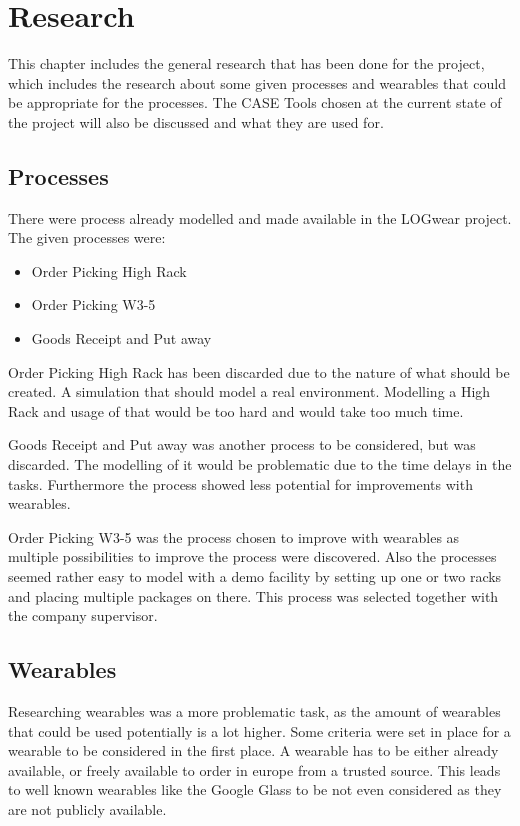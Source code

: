 \chapter{Research}\label{cha:research}
This chapter includes the general research that has been done for the project, which includes the research about some given processes and wearables that could be appropriate for the processes. The CASE Tools chosen at the current state of the project will also be discussed and what they are used for.

\section{Processes}\label{sec:processes}
There were process already modelled and made available in the LOGwear project. The given processes were:

\begin{itemize}
	\item Order Picking High Rack
	\item Order Picking W3-5
	\item Goods Receipt and Put away
\end{itemize}

Order Picking High Rack has been discarded due to the nature of what should be created. A simulation that should model a real environment. Modelling a High Rack and usage of that would be too hard and would take too much time.

Goods Receipt and Put away was another process to be considered, but was discarded. The modelling of it would be problematic due to the time delays in the tasks. Furthermore the process showed less potential for improvements with wearables.

Order Picking W3-5 was the process chosen to improve with wearables as multiple possibilities to improve the process were discovered. Also the processes seemed rather easy to model with a demo facility by setting up one or two racks and placing multiple packages on there. This process was selected together with the company supervisor.

\section{Wearables}\label{sec:wearables}
Researching wearables was a more problematic task, as the amount of wearables that could be used potentially is a lot higher. Some criteria were set in place for a wearable to be considered in the first place. A wearable has to be either already available, or freely available to order in europe from a trusted source. This leads to well known wearables like the Google Glass to be not even considered as they are not publicly available.

